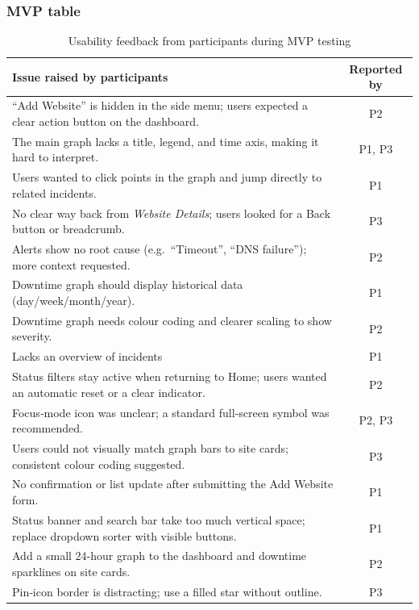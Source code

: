 \subsubsection{MVP table}
\begin{table}[H]
\centering
\begin{tabular}{|p{8.2cm}|c|}
\hline
\textbf{Issue raised by participants} & \textbf{Reported by} \\ \hline
“Add Website” is hidden in the side menu; users expected a clear action button on the dashboard. & P2\\ \hline
The main graph lacks a title, legend, and time axis, making it hard to interpret. & P1, P3 \\ \hline
Users wanted to click points in the graph and jump directly to related incidents. & P1 \\ \hline
No clear way back from \textit{Website Details}; users looked for a Back button or breadcrumb. & P3 \\ \hline
Alerts show no root cause (e.g.\ “Timeout”, “DNS failure”); more context requested. & P2 \\ \hline
Downtime graph should display historical data (day/week/month/year). & P1 \\ \hline
Downtime graph needs colour coding and clearer scaling to show severity. & P2 \\ \hline
Lacks an overview of incidents& P1 \\ \hline
Status filters stay active when returning to Home; users wanted an automatic reset or a clear indicator. & P2 \\ \hline
Focus‑mode icon was unclear; a standard full‑screen symbol was recommended. & P2, P3 \\ \hline
Users could not visually match graph bars to site cards; consistent colour coding suggested. & P3 \\ \hline
No confirmation or list update after submitting the Add Website form. & P1 \\ \hline
Status banner and search bar take too much vertical space; replace dropdown sorter with visible buttons. & P1 \\ \hline
Add a small 24‑hour graph to the dashboard and downtime sparklines on site cards. & P2 \\ \hline
Pin‑icon border is distracting; use a filled star without outline. & P3 \\ \hline
\end{tabular}
\caption{Usability feedback from participants during MVP testing}
\label{tab:mvp-issues}
\end{table}

